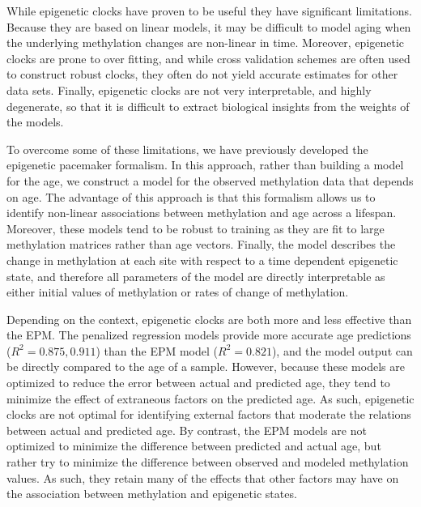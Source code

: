 \documentclass{article}
\begin{document}
{{\begin{linenumbers}
While epigenetic clocks have proven to be useful they have significant limitations.  Because they are based on linear 
models, it may be difficult to model aging when the underlying methylation changes are non-linear in time.  Moreover, 
epigenetic clocks are prone to over fitting, and while cross validation schemes are often used to construct 
robust clocks, they often do not yield accurate estimates for other data sets.  Finally, epigenetic clocks are not 
very interpretable, and highly degenerate, so that it is difficult to extract biological insights from the weights 
of the models.

To overcome some of these limitations, we have previously developed the epigenetic pacemaker formalism.  In this 
approach, rather than building a model for the age, we construct a model for the observed methylation data that 
depends on age.  The advantage of this approach is that this formalism allows us to identify non-linear associations 
between methylation and age across a lifespan.  Moreover, these models tend to be robust to training as they are fit 
to large methylation matrices rather than age vectors. Finally, the model describes the change in methylation at each 
site with respect to a time dependent epigenetic state, and therefore all parameters of the model are directly 
interpretable as either initial values of methylation or rates of change of methylation.

Depending on the context, epigenetic clocks are both more and less effective than the EPM. The penalized regression 
models provide more accurate age predictions ($R^2=0.875,0.911$) than the EPM model ($R^2=0.821$), and the model 
output can be directly compared to the age of a sample. However, because these models are optimized to reduce the 
error between actual and predicted age, they tend to minimize the effect of extraneous factors on the predicted age.  
As such, epigenetic clocks are not optimal for identifying external factors that moderate the relations between actual 
and predicted age.  By contrast, the EPM models are not optimized to minimize the difference between predicted and 
actual age, but rather try to minimize the difference between observed and modeled methylation values.  As such, they 
retain many of the effects that other factors may have on the association between methylation and epigenetic states.  


\end{linenumbers}}}
\end{document}
